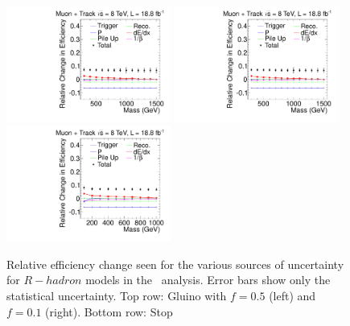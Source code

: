 \begin{figure}[ht]
\centering
  \includegraphics[clip=false, trim=0.0cm 0cm 0.0cm 0cm, width=0.48\textwidth]{figures/tkmu/MuGluino_f50Uncertainty}
  \includegraphics[clip=false, trim=0.0cm 0cm 0.0cm 0cm, width=0.48\textwidth]{figures/tkmu/MuGluino_f10Uncertainty}\\
  \includegraphics[clip=false, trim=0.0cm 0cm 0.0cm 0cm, width=0.48\textwidth]{figures/tkmu/MuStopUncertainty}
\caption[Relative efficiency change seen for the various sources of uncertainty for $R-hadron$ models in the \tktof\ analysis]
{Relative efficiency change seen for the various sources of uncertainty for $R-hadron$ models in the \tktof\ analysis.
Error bars show only the statistical uncertainty.
Top row: Gluino with $f=0.5$ (left) and $f=0.1$ (right).
Bottom row: Stop}
    \label{fig:TkMuRHadUncSource}
\end{figure}


